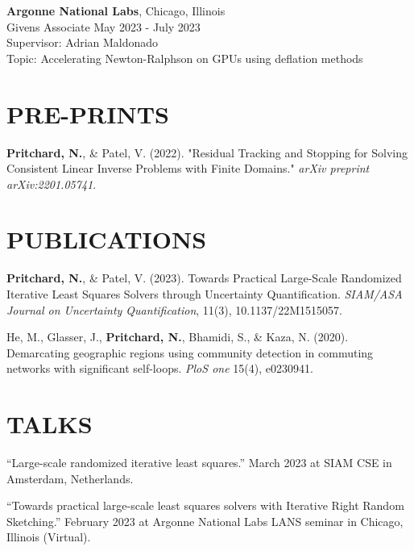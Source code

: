 \documentclass[margin,11pt]{res}
\def\nwp{\textbf{Pritchard, N.}}
\begin{document}
\begin{resume}
                {\bf Argonne National Labs}, \hfill Chicago, Illinois\\
                Givens Associate \hfill May 2023 - July 2023\\
                Supervisor: Adrian Maldonado\\
                Topic: Accelerating Newton-Ralphson on GPUs using deflation methods
\section{PRE-PRINTS}
\nwp, \& Patel, V. (2022). "Residual Tracking and Stopping for Solving Consistent Linear Inverse Problems with Finite Domains." \textit{arXiv preprint arXiv:2201.05741}.

\section{PUBLICATIONS}
\nwp, \& Patel, V. (2023). Towards Practical Large-Scale Randomized Iterative Least Squares Solvers through Uncertainty Quantification. \textit{SIAM/ASA Journal on Uncertainty Quantification}, 11(3), 10.1137/22M1515057. 

He, M., Glasser, J., \nwp, Bhamidi, S., \& Kaza, N. (2020). Demarcating geographic regions using community detection in commuting networks with significant self-loops. \textit{PloS one} 15(4), e0230941.



\section{TALKS}


``Large-scale randomized iterative least squares.'' March 2023 at SIAM CSE in Amsterdam, Netherlands.

``Towards practical large-scale least squares solvers with Iterative Right Random Sketching.'' February 2023 at Argonne National Labs LANS seminar in Chicago, Illinois (Virtual).


\end{resume}
\end{document}
